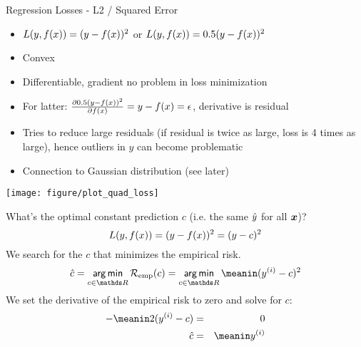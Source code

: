 \documentclass[11pt,compress,t,notes=noshow, xcolor=table]{beamer}
\newenvironment{knitrout}{}{} %
\begin{document}
\begin{vbframe}{Regression Losses - L2 / Squared Error}
\begin{itemize}
\item $L(y, f(x)) = (y-f(x))^2$ or $L(y, f(x)) = 0.5 (y-f(x))^2$
\item Convex
\item Differentiable, gradient no problem in loss minimization
\item For latter: $\frac{\partial{0.5 (y-f(x))^2}}{\partial f(x)} = y - f(x) = \epsilon$, derivative is residual
\item Tries to reduce large residuals (if residual is twice as large, loss is 4 times as large), hence
  outliers in $y$ can become problematic
\item Connection to Gaussian distribution (see later)
\end{itemize}

\begin{knitrout}\scriptsize
{}\color{fgcolor}

{\centering \texttt{[image: figure/plot\_quad\_loss]} 
}



\end{knitrout}
\framebreak


What's the optimal constant prediction $c$ (i.e. the same $\hat{y}$ for all $\bm{x}$)?
$$L(y, f(x)) = (y-f(x))^2 = (y - c)^2$$
We search for the $c$ that minimizes the empirical risk.
$$  \hat{c} = \argmin_{c \in \R}\riske(c)  =  \argmin_{c \in \R} \meanin  (\yi-c)^2 $$
We set the derivative of the empirical risk to zero and solve for $c$:
\begin{eqnarray*}
 -\meanin 2(\yi - c) &=& 0 \cr
\hat{c} &=& \meanin \yi
\end{eqnarray*}

%
%
\end{vbframe}
\end{document}
